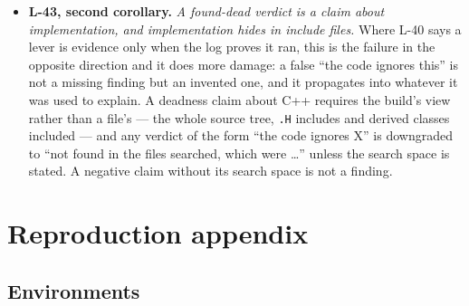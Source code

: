 \documentclass[11pt,a4paper]{article}
\begin{document}
\begin{itemize}
print it back either way. Where the archived log cannot settle it, the conclusion ships marked
\emph{unverifiable-from-logs} rather than quietly assumed. The companion rule from the same arc:
a mesh entering an archive, a pre-registration or a ladder rung carries its \texttt{checkMesh}
record from creation --- born clean or it does not enter.
\item \textbf{L-43, second corollary.} \emph{A found-dead verdict is a claim about
implementation, and implementation hides in include files.} Where L-40 says a lever is evidence
only when the log proves it ran, this is the failure in the opposite direction and it does more
damage: a false ``the code ignores this'' is not a missing finding but an invented one, and it
propagates into whatever it was used to explain. A deadness claim about C++ requires the
build's view rather than a file's --- the whole source tree, \texttt{.H} includes and derived
classes included --- and any verdict of the form ``the code ignores X'' is downgraded to ``not
found in the files searched, which were \ldots'' unless the search space is stated. A negative
claim without its search space is not a finding.
\end{itemize}

\appendix
\section{Reproduction appendix}

\subsection{Environments}
\end{document}
